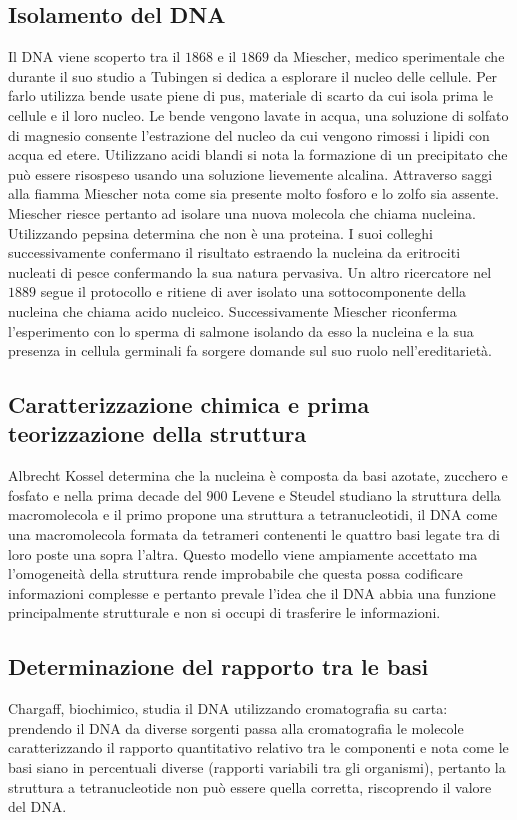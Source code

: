 	\subsection{Isolamento del DNA}
	Il DNA viene scoperto tra il $1868$ e il $1869$ da Miescher, medico sperimentale che durante il suo studio a Tubingen si dedica a esplorare il nucleo delle cellule. 
	Per farlo utilizza bende usate piene di pus, materiale di scarto da cui isola prima le cellule e il loro nucleo. 
	Le bende vengono lavate in acqua, una soluzione di solfato di magnesio consente l'estrazione del nucleo da cui vengono rimossi i lipidi con acqua ed etere. 
	Utilizzano acidi blandi si nota la formazione di un precipitato  che pu\`o essere risospeso usando una soluzione lievemente alcalina. 
	Attraverso saggi alla fiamma Miescher nota come sia presente molto fosforo e lo zolfo sia assente. 
	Miescher riesce pertanto ad isolare una nuova molecola che chiama nucleina. 
	Utilizzando pepsina determina che non \`e una proteina. 
	I suoi colleghi successivamente confermano il risultato estraendo la nucleina da eritrociti nucleati di pesce confermando la sua natura pervasiva. 
	Un altro ricercatore nel $1889$ segue il protocollo e ritiene di aver isolato una sottocomponente della nucleina che chiama acido nucleico. 
	Successivamente Miescher riconferma l'esperimento con lo sperma di salmone isolando da esso la nucleina e la sua presenza in cellula germinali fa sorgere domande sul suo ruolo nell'ereditariet\`a. 

	\subsection{Caratterizzazione chimica e prima teorizzazione della struttura}
	Albrecht Kossel determina che la nucleina \`e composta da basi azotate, zucchero e fosfato e nella prima decade del $900$ Levene e Steudel studiano la struttura della macromolecola e il primo propone una struttura a tetranucleotidi, il DNA come una macromolecola formata da tetrameri contenenti le quattro basi legate tra di loro poste una sopra l'altra. 
	Questo modello viene ampiamente accettato ma l'omogeneit\`a della struttura rende improbabile che questa possa codificare informazioni complesse e pertanto prevale l'idea che il DNA abbia una funzione principalmente strutturale e non si occupi di trasferire le informazioni. 

	\subsection{Determinazione del rapporto tra le basi}
	Chargaff, biochimico, studia il DNA utilizzando cromatografia su carta: prendendo il DNA da diverse sorgenti passa alla cromatografia le molecole caratterizzando il rapporto quantitativo relativo tra le componenti e nota come le basi siano in percentuali diverse (rapporti variabili tra gli organismi), pertanto la struttura a tetranucleotide non pu\`o essere quella corretta, riscoprendo il valore del DNA. 

